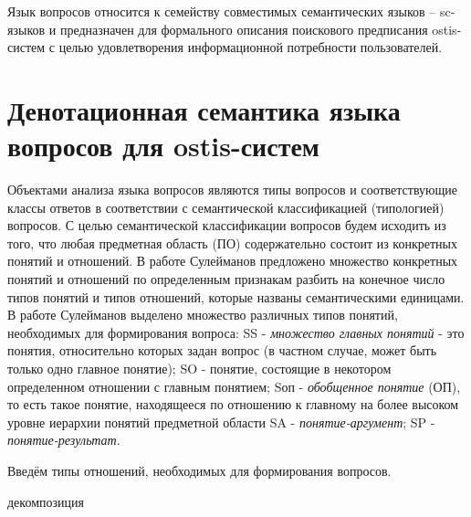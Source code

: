 Язык вопросов относится к семейству совместимых семантических языков – sc-языков и предназначен для формального описания поискового предписания ostis-систем с целью удовлетворения информационной потребности пользователей.

\section{Денотационная семантика языка вопросов для ostis-систем}

Объектами анализа языка вопросов являются типы вопросов и соответствующие классы ответов в соответствии с семантической классификацией (типологией) вопросов.
С целью семантической классификации вопросов будем исходить из того, что любая предметная область (ПО) содержательно состоит из конкретных понятий и отношений. В работе Сулейманов предложено множество конкретных понятий и отношений по определенным признакам разбить на конечное число типов понятий и типов отношений, которые названы семантическими единицами.
В работе Сулейманов выделено множество различных типов понятий, необходимых для формирования вопроса:
SS - \textit{множество главных понятий} - это понятия, относительно которых задан вопрос (в частном случае, может быть только одно главное понятие);
SO - понятие, состоящие в некотором определенном отношении с главным понятием;
Sоп - \textit{обобщенное понятие} (ОП), то есть такое понятие, находящееся по отношению к главному на более высоком уровне иерархии понятий предметной области
SA - \textit{понятие-аргумент};
SP - \textit{понятие-результат}.

Введём типы отношений, необходимых для формирования вопросов.

\begin{SCn}
\end{SCn}

\begin{SCn}
	\begin{scnrelfromset}{декомпозиция}
	\end{scnrelfromset}
\end{SCn}

